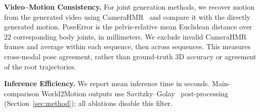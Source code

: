 \noindent\textbf{Video--Motion Consistency.} For joint generation methods, we recover motion from the generated video using CameraHMR~\citep{patel2025camerahmr} and compare it with the directly generated motion. PoseError is the pelvis-relative mean Euclidean distance over 22 corresponding body joints, in millimeters. We exclude invalid CameraHMR frames and average within each sequence, then across sequences. This measures cross-modal pose agreement, rather than ground-truth 3D accuracy or agreement of the root trajectories.

\noindent\textbf{Inference Efficiency.} We report mean inference time in seconds. Main-comparison World2Motion outputs use Savitzky--Golay~\citep{savitzky1964smoothing} post-processing (Section~\ref{sec:method}); all ablations disable this filter.

